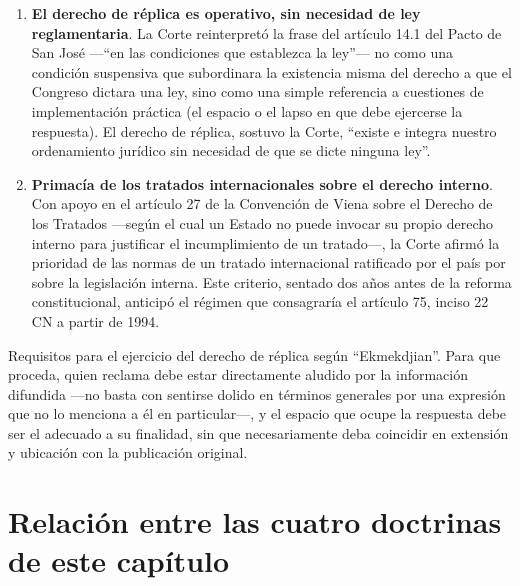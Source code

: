 \documentclass[12pt,oneside]{book}
\begin{document}
\begin{enumerate}[leftmargin=1.6em]
  \item \textbf{El derecho de réplica es operativo, sin necesidad de ley
  reglamentaria}. La Corte reinterpretó la frase del artículo 14.1 del Pacto de
  San José —``en las condiciones que establezca la ley''— no como una condición
  suspensiva que subordinara la existencia misma del derecho a que el Congreso
  dictara una ley, sino como una simple referencia a cuestiones de
  implementación práctica (el espacio o el lapso en que debe ejercerse la
  respuesta). El derecho de réplica, sostuvo la Corte, ``existe e integra nuestro
  ordenamiento jurídico sin necesidad de que se dicte ninguna ley''.
  \item \textbf{Primacía de los tratados internacionales sobre el derecho
  interno}. Con apoyo en el artículo 27 de la Convención de Viena sobre el
  Derecho de los Tratados —según el cual un Estado no puede invocar su propio
  derecho interno para justificar el incumplimiento de un tratado—, la Corte
  afirmó la prioridad de las normas de un tratado internacional ratificado por
  el país por sobre la legislación interna. Este criterio, sentado dos años antes
  de la reforma constitucional, anticipó el régimen que consagraría el artículo
  75, inciso 22 CN a partir de 1994.
\end{enumerate}

\begin{impbox}
Requisitos para el ejercicio del derecho de réplica según ``Ekmekdjian''. Para
que proceda, quien reclama debe estar directamente aludido por la información
difundida —no basta con sentirse dolido en términos generales por una expresión
que no lo menciona a él en particular—, y el espacio que ocupe la respuesta debe
ser el adecuado a su finalidad, sin que necesariamente deba coincidir en
extensión y ubicación con la publicación original.
\end{impbox}

\section{Relación entre las cuatro doctrinas de este capítulo}
\end{document}
